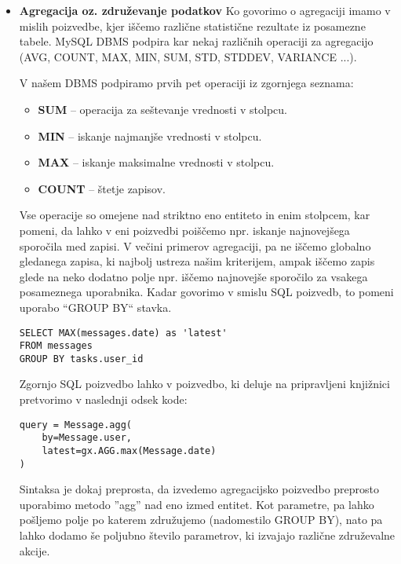 \documentclass[a4paper,12pt,openright]{book}
\begin{document}
\begin{itemize}
        \item \textbf{Agregacija oz. združevanje podatkov}
        \noindent
        Ko govorimo o agregaciji imamo v mislih poizvedbe, kjer iščemo različne statistične rezultate iz posamezne tabele. MySQL DBMS podpira kar nekaj različnih operaciji za agregacijo \cite{MYSQL_AGG} (AVG, COUNT, MAX, MIN, SUM, STD, STDDEV, VARIANCE ...).

        V našem DBMS podpiramo prvih pet operaciji iz zgornjega seznama:
        \begin{itemize}
            \item \textbf{SUM} – operacija za seštevanje vrednosti v stolpcu.
            \item \textbf{MIN} – iskanje najmanjše vrednosti v stolpcu.
            \item \textbf{MAX} – iskanje maksimalne vrednosti v stolpcu.
            \item \textbf{COUNT} – štetje zapisov.
        \end{itemize}

        Vse operacije so omejene nad striktno eno entiteto in enim stolpcem, kar pomeni, da lahko v eni poizvedbi poiščemo npr. iskanje najnovejšega sporočila med zapisi. V večini primerov agregaciji, pa ne iščemo globalno gledanega zapisa, ki najbolj ustreza našim kriterijem, ampak iščemo zapis glede na neko dodatno polje npr. iščemo najnovejše sporočilo za vsakega posameznega uporabnika. Kadar govorimo v smislu SQL poizvedb, to pomeni uporabo ``GROUP BY`` stavka.

\begin{verbatim}
SELECT MAX(messages.date) as 'latest' 
FROM messages
GROUP BY tasks.user_id
\end{verbatim}

        \noindent
        Zgornjo SQL poizvedbo lahko v poizvedbo, ki deluje na pripravljeni knjižnici pretvorimo v naslednji odsek kode:

\begin{verbatim}
query = Message.agg(
    by=Message.user, 
    latest=gx.AGG.max(Message.date)
)
\end{verbatim}

        \noindent
        Sintaksa je dokaj preprosta, da izvedemo agregacijsko poizvedbo preprosto uporabimo metodo ''agg'' nad eno izmed entitet. Kot parametre, pa lahko pošljemo polje po katerem združujemo (nadomestilo GROUP BY), nato pa lahko dodamo še poljubno število parametrov, ki izvajajo različne združevalne akcije.
\end{itemize}
\end{document}
